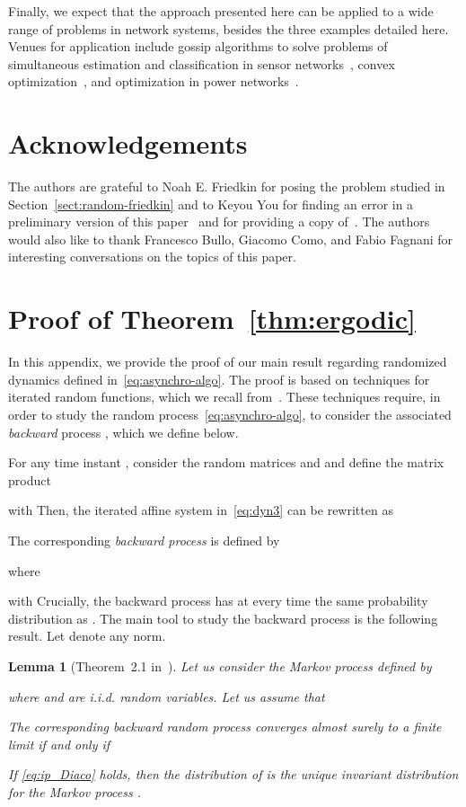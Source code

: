 \documentclass{IEEEtran}
\newtheorem{lemma}{Lemma}
\newcommand{\1}{\mathbf{1}} \newcommand{\ind}{\mathds{1}}
\begin{document}
Finally, we expect that the approach presented here can be applied to a wide range of problems in network systems, besides the three examples detailed here. Venues for application include gossip algorithms to solve problems of simultaneous estimation and classification in sensor networks~\cite{FF-SF-CR:11}, convex optimization~\cite{AN:11}, and optimization in power networks~\cite{SB-SZ:13}.



\section*{Acknowledgements}
The authors are grateful to Noah E. Friedkin for posing the problem studied in Section~\ref{sect:random-friedkin} and to Keyou You for finding an error in a preliminary version of this paper~\cite{CR-PF-RT-HI:13b} and for providing a copy of~\cite{KY-SS-LQ:14}. The authors would also like to thank Francesco Bullo, Giacomo Como, and Fabio Fagnani for interesting conversations on the topics of this paper. 


\appendices
\section{Proof of Theorem~\ref{thm:ergodic}}
\label{sec:proof}
In this appendix, we provide the proof of our main result regarding randomized dynamics defined in~\eqref{eq:asynchro-algo}. The proof is based on techniques for iterated random functions, which we recall from~\cite{PD-DF:99}. These techniques require, in order to study the random process~\eqref{eq:asynchro-algo}, to consider the associated {\em backward} process , which we define below.

For any time instant , consider the random matrices  and  and define the matrix product

with 
Then, the iterated affine system in~\eqref{eq:dyn3} can be rewritten as

The corresponding \emph{backward process} is defined by

where

with 
Crucially, the backward process  has at every time  the same probability distribution as . 
The main tool to study the backward process is the following result. Let  denote any norm.

\begin{lemma}[Theorem~2.1 in~\cite{PD-DF:99}]\label{Diaco}
Let us consider the Markov { {process}}  defined by
 
where  and  are i.i.d. random variables.
Let us assume that

The corresponding backward random process  converges almost surely to a finite limit  if and only if

If \eqref{eq:ip_Diaco} holds, then the distribution of  is the unique invariant distribution for the Markov process .
\end{lemma}
\end{document}
